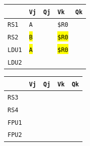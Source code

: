 \begin{enumerate}
    \begin{minipage}{0.45\textwidth}
        \centering
        \begin{tabular}{@{} l | l l l l @{}}
            \toprule
                & \texttt{Vj} & \texttt{Qj} & \texttt{Vk} & \texttt{Qk} \\
            \midrule
            \texttt{RS1} & \texttt{A} & & \texttt{\$R0} & \\ [.3em]
            \texttt{RS2} & \hl{\texttt{B}} & & \hl{\texttt{\$R0}} & \\
            \cmidrule{1-5}
            \texttt{LDU1} & \hl{\texttt{A}} & & \hl{\texttt{\$R0}} & \\ [.3em]
            \texttt{LDU2} & & & & \\
            \bottomrule
        \end{tabular}
    \end{minipage}
    \hfill
    \begin{minipage}{0.45\textwidth}
        \centering
        \begin{tabular}{@{} l | l l l l @{}}
            \toprule
            & \texttt{Vj} & \texttt{Qj} & \texttt{Vk} & \texttt{Qk} \\
            \midrule
            \texttt{RS3} & & & & \\ [.3em]
            \texttt{RS4} & & & & \\
            \cmidrule{1-5}
            \texttt{FPU1} & & & & \\ [.3em]
            \texttt{FPU2} & & & & \\
            \bottomrule
        \end{tabular}
    \end{minipage}


\end{enumerate}
